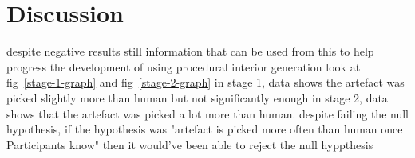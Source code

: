 \section{Discussion}
despite negative results
still information that can be used from this
to help progress the development of using procedural interior generation
look at fig~\ref{stage-1-graph} and fig~\ref{stage-2-graph}
in stage 1, data shows the artefact was picked slightly more than human but not significantly enough
in stage 2, data shows that the artefact was picked a lot more than human. despite failing the null hypothesis, if the hypothesis was "artefact is picked more often than human once Participants know" then it would've been able to reject the null hyppthesis
